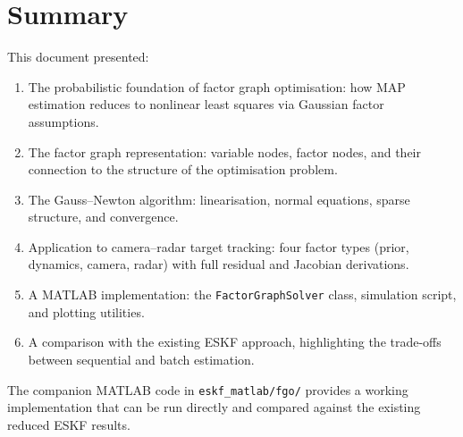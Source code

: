 \documentclass[11pt,a4paper]{article}
\begin{document}
\section{Summary}
\label{sec:summary}

This document presented:
\begin{enumerate}[nosep]
  \item The probabilistic foundation of factor graph optimisation: how
        MAP estimation reduces to nonlinear least squares via Gaussian
        factor assumptions.
  \item The factor graph representation: variable nodes, factor nodes,
        and their connection to the structure of the optimisation
        problem.
  \item The Gauss--Newton algorithm: linearisation, normal equations,
        sparse structure, and convergence.
  \item Application to camera--radar target tracking: four factor types
        (prior, dynamics, camera, radar) with full residual and Jacobian
        derivations.
  \item A MATLAB implementation: the \texttt{FactorGraphSolver} class,
        simulation script, and plotting utilities.
  \item A comparison with the existing ESKF approach, highlighting the
        trade-offs between sequential and batch estimation.
\end{enumerate}

The companion MATLAB code in \texttt{eskf\_matlab/fgo/} provides a
working implementation that can be run directly and compared against the
existing reduced ESKF results.
\end{document}
